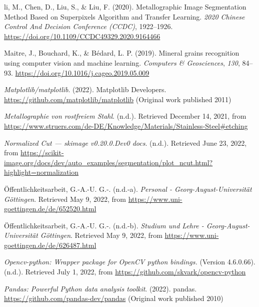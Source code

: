 \documentclass[
  12pt,
  openany]{book}
\newlength{\cslhangindent}
\newlength{\cslentryspacingunit} %
\newenvironment{CSLReferences}[2] %
 {%
  \setlength{\parindent}{0pt}
  \ifodd #1
  \let\oldpar\par
  \def\par{\hangindent=\cslhangindent\oldpar}
  \fi
  \setlength{\parskip}{#2\cslentryspacingunit}
 }%
 {}
\begin{document}
\begin{CSLReferences}{1}{0}
\leavevmode{}%
li, M., Chen, D., Liu, S., \& Liu, F. (2020). Metallographic {Image Segmentation Method Based} on {Superpixels Algorithm} and {Transfer Learning}. \emph{2020 {Chinese Control And Decision Conference} ({CCDC})}, 1922--1926. \url{https://doi.org/10.1109/CCDC49329.2020.9164466}

\leavevmode{}%
Maitre, J., Bouchard, K., \& Bédard, L. P. (2019). Mineral grains recognition using computer vision and machine learning. \emph{Computers \& Geosciences}, \emph{130}, 84--93. \url{https://doi.org/10.1016/j.cageo.2019.05.009}

\leavevmode{}%
\emph{Matplotlib/matplotlib}. (2022). {Matplotlib Developers}. \url{https://github.com/matplotlib/matplotlib} (Original work published 2011)

\leavevmode{}%
\emph{Metallographie von rostfreiem Stahl}. (n.d.). Retrieved December 14, 2021, from \url{https://www.struers.com/de-DE/Knowledge/Materials/Stainless-Steel\#etching}

\leavevmode{}%
\emph{Normalized {Cut} --- skimage v0.20.0.Dev0 docs}. (n.d.). Retrieved June 23, 2022, from \url{https://scikit-image.org/docs/dev/auto_examples/segmentation/plot_ncut.html?highlight=normalization}

\leavevmode{}%
Öffentlichkeitsarbeit, G.-A.-U. G.-. (n.d.-a). \emph{Personal - Georg-August-Universität Göttingen}. Retrieved May 9, 2022, from \url{https://www.uni-goettingen.de/de/652520.html}

\leavevmode{}%
Öffentlichkeitsarbeit, G.-A.-U. G.-. (n.d.-b). \emph{Studium und Lehre - Georg-August-Universität Göttingen}. Retrieved May 9, 2022, from \url{https://www.uni-goettingen.de/de/626487.html}

\leavevmode{}%
\emph{Opencv-python: {Wrapper} package for {OpenCV} python bindings.} (Version 4.6.0.66). (n.d.). Retrieved July 1, 2022, from \url{https://github.com/skvark/opencv-python}

\leavevmode{}%
\emph{Pandas: Powerful {Python} data analysis toolkit}. (2022). {pandas}. \url{https://github.com/pandas-dev/pandas} (Original work published 2010)


\end{CSLReferences}
\end{document}
